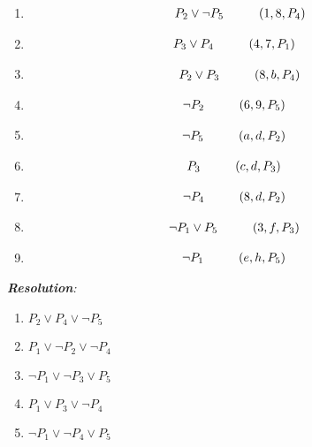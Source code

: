\documentclass[a4paper,12pt]{article}
\newcommand\tab[1][1cm]{\hspace*{#1}}
\begin{document}
\begin{enumerate}
\begin{multicols}{3}
	\end{multicols}
	\begin{multicols}{2}
		\begin{enumerate}
			\item \begin{align*}
				P_2\lor\neg P_5\tab (1,8,P_4)
			\end{align*}
			\item \begin{align*}
				P_3\lor P_4\tab & (4,7,P_1)
			\end{align*}
			\item \begin{align*}
				P_2\lor P_3\tab (8,b,P_4)
			\end{align*}
			\item \begin{align*}
				\neg P_2\tab & (6,9,P_5) 
			\end{align*}
			\item \begin{align*}
				\neg P_5\tab & (a,d,P_2)
			\end{align*}
			\item \begin{align*}
				P_3\tab & (c,d,P_3)
			\end{align*}
			\item \begin{align*}
				\neg P_4\tab & (8,d,P_2)
			\end{align*}
			\item \begin{align*}
				\neg P_1\lor P_5\tab & (3,f,P_3)
			\end{align*}
			\item \begin{align*}
				\neg P_1\tab & (e,h,P_5)
			\end{align*}
		\end{enumerate}
	\end{multicols}
	\emph{\textbf{Resolution}:}\\
	\begin{multicols}{3}
		\begin{enumerate}[(1)] 
			\item $P_2 \lor P_4 \lor  \neg P_5$
			\item $P_1 \lor  \neg P_2 \lor  \neg P_4$
			\item $\neg P_1 \lor  \neg P_3 \lor P_5$
			\item $ P_1 \lor P_3 \lor  \neg P_4$
			\item $\neg P_1 \lor  \neg P_4 \lor P_5$

\end{enumerate}
\end{multicols}
\end{enumerate}
\end{document}
